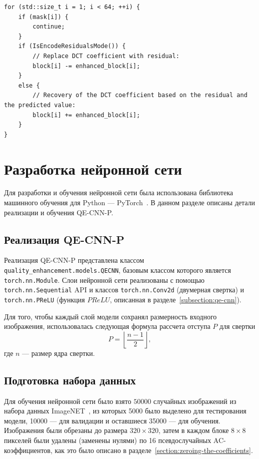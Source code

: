 \documentclass[times,specification,annotation]{itmo-student-thesis}
\begin{document}
\begin{lstlisting}[float=!h,caption={Замена коэффициентов ДКП на ошибки предсказания и наоборот},label={listing:replacement-dct-coefficients-with-residuals}]
for (std::size_t i = 1; i < 64; ++i) {
    if (mask[i]) {
        continue;
    }
    if (IsEncodeResidualsMode()) {
        // Replace DCT coefficient with residual:
        block[i] -= enhanced_block[i];
    }
    else {
        // Recovery of the DCT coefficient based on the residual and the predicted value:
        block[i] += enhanced_block[i];
    }
}
\end{lstlisting}

\section{Разработка нейронной сети}\label{section:model-implementation}

Для разработки и обучения нейронной сети была использована библиотека машинного обучения для Python --- PyTorch~\cite{pytorch}. В данном разделе описаны детали реализации и обучения QE-CNN-P.

\subsection{Реализация QE-CNN-P}\label{subsection:model-implementation}

Реализация QE-CNN-P представлена классом \texttt{quality\_enhancement.models.QECNN}, базовым классом которого является \texttt{torch.nn.Module}. Слои нейронной сети реализованы с помощью \texttt{torch.nn.Sequential} API и классов \texttt{torch.nn.Conv2d} (двумерная свертка) и \texttt{torch.nn.PReLU} (функция $PReLU$, описанная в разделе~\ref{subsection:qe-cnn}).\par

Для того, чтобы каждый слой модели сохранял размерность входного изображения, использовалась следующая формула рассчета отступа $P$ для свертки
\[
    P = \left\lfloor\dfrac{n - 1}{2}\right\rfloor,
\]
где $n$ --- размер ядра свертки.

\subsection{Подготовка набора данных}\label{subsection:dataset-preparing}

Для обучения нейронной сети было взято $50000$ случайных изображений из набора данных ImageNET~\cite{image-net}, из которых 5000 было выделено для тестирования модели, 10000 --- для валидации и оставшиеся 35000 --- для обучения. Изображения были обрезаны до размера $320\times320$, затем в каждом блоке $8\times8$ пикселей были удалены (заменены нулями) по 16 псевдослучайных AC-коэффициентов, как это было описано в разделе~\ref{section:zeroing-the-coefficients}.\par
\end{document}
